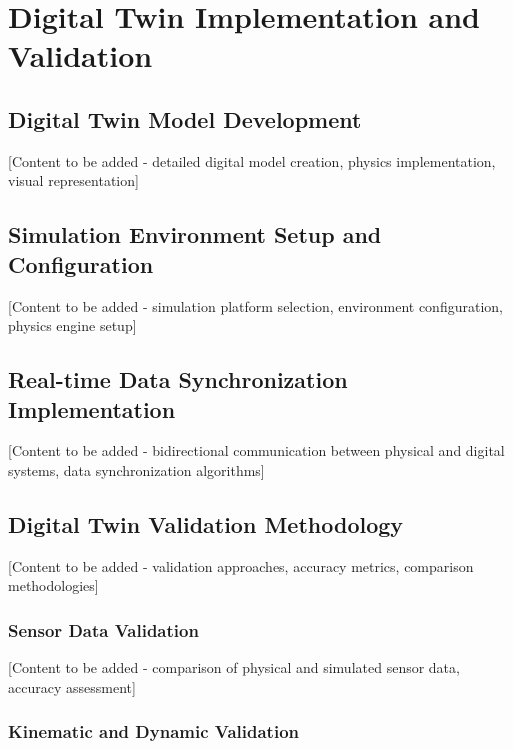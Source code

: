 \vspace{21.5pt}
\chapter{Digital Twin Implementation and Validation}

\section{Digital Twin Model Development}

[Content to be added - detailed digital model creation, physics implementation, visual representation]

\section{Simulation Environment Setup and Configuration}

[Content to be added - simulation platform selection, environment configuration, physics engine setup]

\section{Real-time Data Synchronization Implementation}

[Content to be added - bidirectional communication between physical and digital systems, data synchronization algorithms]

\section{Digital Twin Validation Methodology}

[Content to be added - validation approaches, accuracy metrics, comparison methodologies]

\subsection{Sensor Data Validation}

[Content to be added - comparison of physical and simulated sensor data, accuracy assessment]

\subsection{Kinematic and Dynamic Validation}

